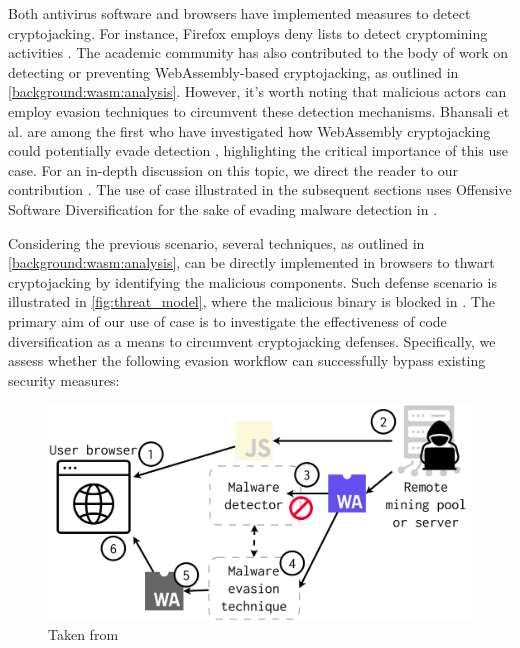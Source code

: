 Both antivirus software and browsers have implemented measures to detect cryptojacking. For instance, Firefox employs deny lists to detect cryptomining activities \cite{firefoxcrypto}. 
The academic community has also contributed to the body of work on detecting or preventing WebAssembly-based cryptojacking, as outlined in \autoref{background:wasm:analysis}. 
However, it's worth noting that malicious actors can employ evasion techniques to circumvent these detection mechanisms. 
Bhansali et al. are among the first who have investigated how WebAssembly cryptojacking could potentially evade detection \cite{10.1145/3507657.3528560}, highlighting the critical importance of this use case. 
For an in-depth discussion on this topic, we direct the reader to our contribution \cite{EVASION}.
The use of case illustrated in the subsequent sections uses Offensive Software Diversification for the sake of evading malware detection in \Wasm. 


\label{threat_model}


Considering the previous scenario, several techniques, as outlined in \autoref{background:wasm:analysis}, can be directly implemented in browsers to thwart cryptojacking by identifying the malicious \Wasm components. 
Such defense scenario is illustrated in \autoref{fig:threat_model}, where the \Wasm malicious binary is blocked in .
The primary aim of our use of case is to investigate the effectiveness of code diversification as a means to circumvent cryptojacking defenses. 
Specifically, we assess whether the following evasion workflow can successfully bypass existing security measures:

\begin{figure}
    \centering
    \includegraphics[width=0.8\linewidth]{figures/threat_model.pdf}
    \caption{Taken from \cite{EVASION}}
    \label{fig:threat_model}
\end{figure}


